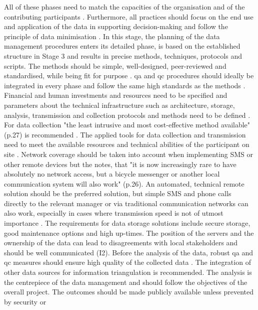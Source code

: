 All of these phases need to match the capacities of the organisation and of the contributing participants \autocite{ifrcCommunityBasedSurveillanceGuiding2017,minkmanCitizenScienceWater2015}. Furthermore, all practices should focus on the end use and application of the data in supporting decision-making and follow the principle of data minimisation \autocite{edpsGlossaryEuropeanData2023,ifrcCommunityBasedSurveillanceGuiding2017,minkmanCitizenScienceWater2015}. In this stage, the planning of the data management procedures enters its detailed phase, is based on the established structure in Stage 3 and results in precise methods, techniques, protocols and scripts. The methods should be simple, well-designed, peer-reviewed and standardised, while being fit for purpose \autocite{fraislCitizenScienceEnvironmental2022,ifrcCommunityBasedSurveillanceGuiding2017,silvertownNewDawnCitizen2009,whitelawEstablishingCanadianCommunity2003}. \acrshort{qa} and \acrshort{qc} procedures should ideally be integrated in every phase and follow the same high standards as the methods \autocite{fraislCitizenScienceEnvironmental2022,mackechnieRoleBigSociety2011,sharpeCommunityBasedEcological2006,silvertownNewDawnCitizen2009}. Financial and human investments and resources need to be specified and parameters about the technical infrastructure such as architecture, storage, analysis, transmission and collection protocols and methods need to be defined \autocite{fraislCitizenScienceEnvironmental2022,sharpeCommunityBasedEcological2006}. For data collection "the least intrusive and most cost-effective method available" (p.27) is recommended \autocite{ifrcCommunityBasedSurveillanceGuiding2017}. The applied tools for data collection and transmission need to meet the available resources and technical abilities of the participant on site \autocite{ifrcCommunityBasedSurveillanceGuiding2017,minkmanCitizenScienceWater2015}. Network coverage should be taken into account when implementing SMS or other remote devices but the \textcite{ifrcCommunityBasedSurveillanceGuiding2017} notes, that "it is now increasingly rare to have absolutely no network access, but a bicycle messenger or another local communication system will also work" (p.26). An automated, technical remote solution should be the preferred solution, but simple SMS and phone calls directly to the relevant manager or via traditional communication networks can also work, especially in cases where transmission speed is not of utmost importance \autocite{gualazziniEWEAEarlyWarning2021,ifrcCommunityBasedSurveillanceGuiding2017}. The requirements for data storage solutions include secure storage, good maintenance options and high up-times. The position of the servers and the ownership of the data can lead to disagreements with local stakeholders and should be well communicated (I2). Before the analysis of the data, robust \acrshort{qa} and \acrshort{qc} measures should ensure high quality of the collected data \autocite{fraislCitizenScienceEnvironmental2022,sharpeCommunityBasedEcological2006}. The integration of other data sources for information triangulation is recommended. The analysis is the centrepiece of the data management and should follow the objectives of the overall project. The outcomes should be made publicly available unless prevented by security or 